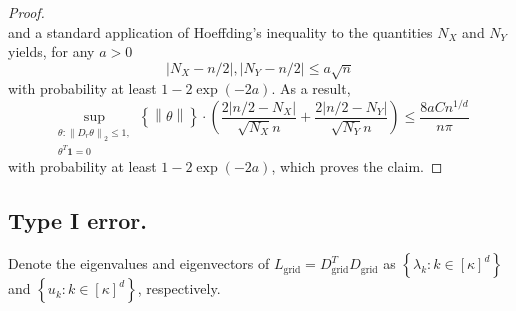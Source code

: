 \documentclass{article}
\newcommand{\norm}[1]{\left\lVert#1\right\rVert}
\newcommand{\abs}[1]{\left \lvert #1 \right \rvert}
\newcommand{\set}[1]{\left\{#1\right\}}
\newcommand{\1}{\mathbb{I}}
\newcommand{\Lgrid}{L_{\grid}}
\newcommand{\Dgrid}{D_{\grid}}
\newcommand{\grid}{\mathrm{grid}}
\theoremstyle{alden}
\theoremstyle{aldenthm}
\theoremstyle{definition}
\theoremstyle{remark}
\begin{document}
\begin{proof}
\begin{equation*}
	\end{equation*}
	and a standard application of Hoeffding's inequality to the quantities $N_X$ and $N_Y$ yields, for any $a > 0$
	\begin{equation*}
	\abs{N_X - n/2}, \abs{N_Y - n/2} \leq  a \sqrt{n}
	\end{equation*}
	with probability at least $1 - 2 \exp(-2a)$. As a result,
	\begin{equation*}
	\sup_{\substack{\theta: \norm{D_r \theta}_2 \leq 1, \\ \theta^T \mathbf{1} = 0} } \set{\norm{\theta}} \cdot \left(\frac{2\abs{n/2 - N_X}}{\sqrt{N_X} n} + \frac{2\abs{n/2 - N_Y}}{\sqrt{N_Y} n} \right) \leq \frac{8a C n^{1/d}}{n\pi} 
	\end{equation*}
	with probability at least $1 - 2 \exp(-2a)$, which proves the claim.
\end{proof}

\subsection{Type I error.}

Denote the eigenvalues and eigenvectors of $\Lgrid = \Dgrid^T \Dgrid$ as $\set{\lambda_{k}: k \in [\kappa]^d}$ and $\set{u_{k}: k \in [\kappa]^d}$, respectively.
\end{document}
